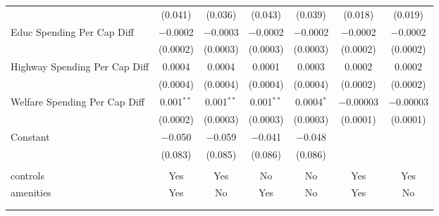 \begin{table}[!htbp]
\begin{tabular}{@{\extracolsep{5pt}}lcccccc}
  & (0.041) & (0.036) & (0.043) & (0.039) & (0.018) & (0.019) \\ 
  Educ Spending Per Cap Diff & $-$0.0002 & $-$0.0003 & $-$0.0002 & $-$0.0002 & $-$0.0002 & $-$0.0002 \\ 
  & (0.0002) & (0.0003) & (0.0003) & (0.0003) & (0.0002) & (0.0002) \\ 
  Highway Spending Per Cap Diff & 0.0004 & 0.0004 & 0.0001 & 0.0003 & 0.0002 & 0.0002 \\ 
  & (0.0004) & (0.0004) & (0.0004) & (0.0004) & (0.0002) & (0.0002) \\ 
  Welfare Spending Per Cap Diff & 0.001$^{**}$ & 0.001$^{**}$ & 0.001$^{**}$ & 0.0004$^{*}$ & $-$0.00003 & $-$0.00003 \\ 
  & (0.0002) & (0.0003) & (0.0003) & (0.0003) & (0.0001) & (0.0001) \\ 
  Constant & $-$0.050 & $-$0.059 & $-$0.041 & $-$0.048 &  &  \\ 
  & (0.083) & (0.085) & (0.086) & (0.086) &  &  \\ 
 \hline \\[-1.8ex] 
controls & Yes & Yes & No & No & Yes & Yes \\ 
amenities & Yes & No & Yes & No & Yes & No \\ 
\hline \\[-1.8ex] 
\hline 
\hline \\[-1.8ex] 
\end{tabular} 
\end{table} 
